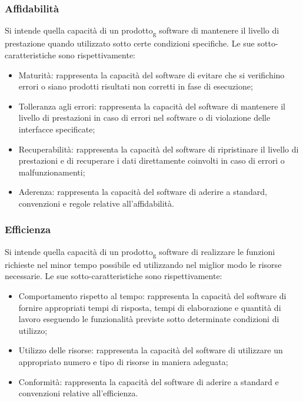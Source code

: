 \subsubsection{Affidabilità}
Si intende quella capacità di un prodotto\textsubscript{g} software di mantenere il livello di prestazione quando utilizzato sotto certe condizioni specifiche.
Le sue sotto-caratteristiche sono rispettivamente:
\begin{itemize}
\item Maturità: rappresenta la capacità del software di evitare che si verifichino errori o siano prodotti risultati non corretti in fase di esecuzione;
\item Tolleranza agli errori: rappresenta la capacità del software  di mantenere il livello di prestazioni in caso di errori nel software o di violazione delle interfacce specificate;
\item Recuperabilità: rappresenta la capacità del software di ripristinare il livello di prestazioni e di recuperare i dati direttamente coinvolti in caso di errori o malfunzionamenti;
\item Aderenza: rappresenta la capacità del software di aderire a standard, convenzioni e regole relative all'affidabilità.
\end{itemize}

\subsubsection{Efficienza}
Si intende quella capacità di un prodotto\textsubscript{g} software di realizzare le funzioni richieste nel minor tempo possibile ed utilizzando nel miglior modo le risorse necessarie.
Le sue sotto-caratteristiche sono rispettivamente:
\begin{itemize}
\item Comportamento rispetto al tempo: rappresenta la capacità del software di fornire appropriati tempi di risposta, tempi di elaborazione e quantità di lavoro eseguendo le funzionalità previste sotto determinate condizioni di utilizzo;
\item Utilizzo delle risorse: rappresenta la capacità del software di utilizzare un appropriato numero e tipo di risorse in maniera adeguata;
\item Conformità: rappresenta la capacità del software di aderire a standard e convenzioni relative all'efficienza.
\end{itemize}

